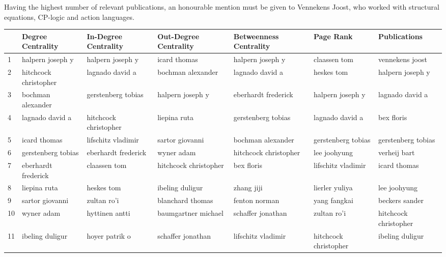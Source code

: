 \documentclass[11pt,a4paper]{book}
\theoremstyle{definition}
\theoremstyle{definition}
\theoremstyle{definition}
\theoremstyle{remark}
\begin{document}
Having the highest number of relevant publications, an honourable mention must be given to Vennekens Joost, who worked with structural equations, CP-logic and action languages. 
\begin{table}
\centering
\scriptsize
\begin{tabular}{lllllll}
\toprule
{} &     Degree Centrality &    In-Degree Centrality &   Out-Degree Centrality &  Betweenness Centrality &   Page Rank & Publications \\
\midrule
1  &       halpern joseph y &       halpern joseph y &           icard thomas &       halpern joseph y &           claassen tom &        vennekens joost \\
2  &  hitchcock christopher &        lagnado david a &      bochman alexander &        lagnado david a &             heskes tom &       halpern joseph y \\
3  &      bochman alexander &     gerstenberg tobias &       halpern joseph y &    eberhardt frederick &       halpern joseph y &        lagnado david a \\
4  &        lagnado david a &  hitchcock christopher &           liepina ruta &     gerstenberg tobias &        lagnado david a &             bex floris \\
5  &           icard thomas &     lifschitz vladimir &        sartor giovanni &      bochman alexander &     gerstenberg tobias &     gerstenberg tobias \\
6  &     gerstenberg tobias &    eberhardt frederick &             wyner adam &  hitchcock christopher &           lee joohyung &           verheij bart \\
7  &    eberhardt frederick &           claassen tom &  hitchcock christopher &             bex floris &     lifschitz vladimir &           icard thomas \\
8  &           liepina ruta &             heskes tom &        ibeling duligur &             zhang jiji &         lierler yuliya &           lee joohyung \\
9  &        sartor giovanni &            zultan ro'i &       blanchard thomas &          fenton norman &           yang fangkai &         beckers sander \\
10  &             wyner adam &         hyttinen antti &    baumgartner michael &      schaffer jonathan &            zultan ro'i &  hitchcock christopher \\
11 &        ibeling duligur &         hoyer patrik o &      schaffer jonathan &     lifschitz vladimir &  hitchcock christopher &        ibeling duligur \\

\end{tabular}
\end{table}
\end{document}
